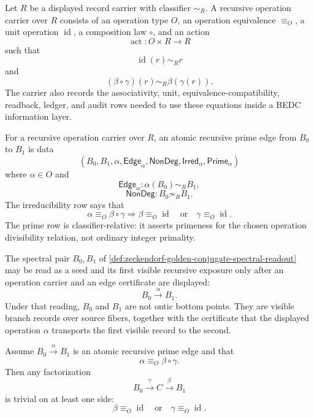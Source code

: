 \begin{definition}
\label{def:axiszeckendorf-recursive-operation-carrier}
Let $R$ be a displayed record carrier with classifier $\sim_R$.  A
recursive operation carrier over $R$ consists of an operation type $O$, an
operation equivalence $\equiv_O$, a unit operation $\operatorname{id}$, a
composition law $\circ$, and an action
$$
\operatorname{act}:O\times R\to R
$$
such that
$$
\operatorname{id}(r)\sim_R r
$$
and
$$
(\beta\circ\gamma)(r)\sim_R\beta(\gamma(r)).
$$
The carrier also records the associativity, unit, equivalence-compatibility,
readback, ledger, and audit rows needed to use these equations inside a
BEDC information layer.
\end{definition}

\begin{definition}
\label{def:axiszeckendorf-atomic-recursive-prime-edge}
For a recursive operation carrier over $R$, an atomic recursive prime edge
from $B_0$ to $B_1$ is data
$$
(B_0,B_1,\alpha,\mathsf{Edge}_{\alpha},\mathsf{NonDeg},
\mathsf{Irred}_{\alpha},\mathsf{Prime}_{\alpha})
$$
where $\alpha\in O$ and
$$
\mathsf{Edge}_{\alpha}:\alpha(B_0)\sim_R B_1,
$$
$$
\mathsf{NonDeg}:B_0\not\sim_R B_1.
$$
The irreducibility row says that
$$
\alpha\equiv_O\beta\circ\gamma
\Longrightarrow
\beta\equiv_O\operatorname{id}
\quad\text{or}\quad
\gamma\equiv_O\operatorname{id}.
$$
The prime row is classifier-relative: it asserts primeness for the chosen
operation divisibility relation, not ordinary integer primality.
\end{definition}

\begin{principle}
\label{prin:axiszeckendorf-golden-branch-recursive-edge}
The spectral pair $B_0,B_1$ of
\autoref{def:zeckendorf-golden-conjugate-spectral-readout} may be read as
a seed and its first visible recursive exposure only after an operation
carrier and an edge certificate are displayed:
$$
B_0\xrightarrow{\alpha}B_1.
$$
Under that reading, $B_0$ and $B_1$ are not ontic bottom points.  They are
visible branch records over source fibers, together with the certificate
that the displayed operation $\alpha$ transports the first visible record
to the second.
\end{principle}

\begin{theorem}
\label{thm:axiszeckendorf-atomic-edge-no-intermediate-operation}
Assume $B_0\xrightarrow{\alpha}B_1$ is an atomic recursive prime edge and
that
$$
\alpha\equiv_O\beta\circ\gamma.
$$
Then any factorization
$$
B_0\xrightarrow{\gamma}C\xrightarrow{\beta}B_1
$$
is trivial on at least one side:
$$
\beta\equiv_O\operatorname{id}
\quad\text{or}\quad
\gamma\equiv_O\operatorname{id}.
$$
\end{theorem}

